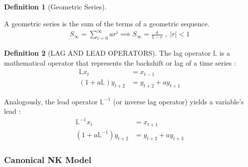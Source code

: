 \documentclass[
	12pt, 
	]{article}
\numberwithin{equation}{section}
\theoremstyle{definition}
\newtheorem{definition}{Definition}[section]
\theoremstyle{plain}
\theoremstyle{plain}
\theoremstyle{plain}
\begin{document}

\begin{definition}[Geometric Series]\label{def:geometric-series}
	
	A geometric series is the sum of the terms of a geometric sequence.
	\begin{align*}
		S_\infty = \sum_{i=0}^{\infty} ar^i \implies 
		S_\infty = \frac{a}{1-r} \; , \; |r| <1
	\end{align*}
	
\end{definition}


\begin{definition}[LAG AND LEAD OPERATORS]\label{def:lag-operator}
	The lag operator $\mathbb{L}$ is a mathematical operator that represents the backshift or lag of a time series \cite[Lecture 13, p.9]{solis-garcia_ucb_2022}:
	\begin{align*}
		\mathbb{L} x_t            & = x_{t-1}              \\
		(1 + a\mathbb{L})y_{t+2} & = y_{t+2} + ay_{t+1}
	\end{align*}
	
	Analogously, the lead operator $\mathbb{L}^{-1}$ (or inverse lag operator) yields a variable's lead \cite[Lecture 13, p.9]{solis-garcia_ucb_2022}:
	\begin{align*}
		\mathbb{L}^{-1} x_t            & = x_{t+1}              \\
		(1 + a\mathbb{L}^{-1}) y_{t+2} & = y_{t+2} + ay_{t+3}
	\end{align*}
\end{definition}

\subsubsection{Canonical NK Model}

\end{document}
